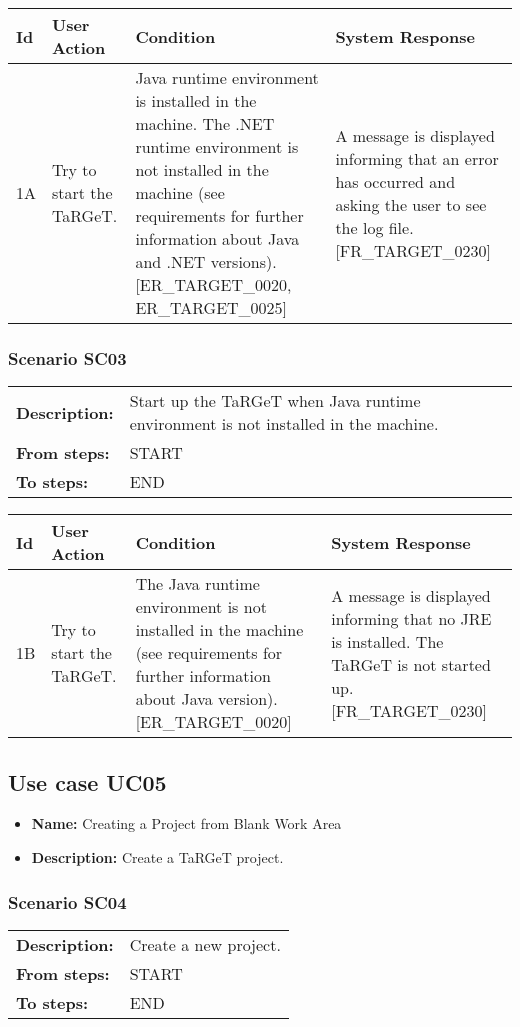 \documentclass[a4paper,11pt]{article}
\newcommand{\bl}{\\ \hline}
\begin{document}
\begin{tabular}{|p{0.8in}|p{1.6in}|p{1.6in}|p{1.6in}|}
\hline
Id & User Action & Condition & System Response  \bl 
1A & Try to start the TaRGeT. & Java runtime environment is installed in the machine.
						The .NET runtime environment is not installed in the machine (see
						requirements for further information about Java and .NET
						versions). [ER_TARGET_0020, ER_TARGET_0025] & A message is displayed informing that an error has
						occurred and asking the user to see the log file. [FR_TARGET_0230]
					 \bl 
\end{tabular}
\subsubsection*{Scenario SC03}
\begin{tabular}{p{1in}p{4in}}
{\bf Description:} & Start up the TaRGeT when Java runtime environment is
					not installed in the machine. \\
{\bf From steps:} & START \\
{\bf To steps:} & END \\
\end{tabular}
 
\begin{tabular}{|p{0.8in}|p{1.6in}|p{1.6in}|p{1.6in}|}
\hline
Id & User Action & Condition & System Response  \bl 
1B & Try to start the TaRGeT. & The Java runtime environment is not installed in the
						machine (see requirements for further information about Java
						version). [ER_TARGET_0020] & A message is displayed informing that no JRE is
						installed. The TaRGeT is not started up. [FR_TARGET_0230]
					 \bl 
\end{tabular}
\subsection*{Use case UC05}
\begin{itemize}
\item {\bf Name: }Creating a Project from Blank Work Area
\item {\bf Description: }Create a TaRGeT project.
\end{itemize}
\subsubsection*{Scenario SC04}
\begin{tabular}{p{1in}p{4in}}
{\bf Description:} & Create a new project. \\
{\bf From steps:} & START \\
{\bf To steps:} & END \\
\end{tabular}
 
\end{document}
